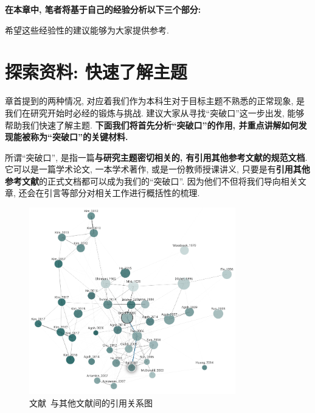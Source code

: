 \documentclass{booki}
\begin{document}
\textbf{在本章中, 笔者将基于自己的经验分析以下三个部分:}
{\begin{center}
    \noindent{}
\end{center}}
希望这些经验性的建议能够为大家提供参考.

\section{探索资料: 快速了解主题}
章首提到的两种情况, 对应着我们作为本科生对于目标主题不熟悉的正常现象, 是我们在研究开始时必经的锻炼与挑战. 建议大家从寻找``突破口''这一步出发, 能够帮助我们快速了解主题. {\textbf{下面我们将首先分析``突破口''的作用, 并重点讲解如何发现能被称为``突破口''的关键材料.}}

所谓``突破口'', 是指一篇\textbf{与研究主题密切相关的, 有引用其他参考文献的规范文档}. 它可以是一篇学术论文, 一本学术著作, 或是一份教师授课讲义, 只要是有\textbf{引用其他参考文献}的正式文档都可以成为我们的``突破口''. 因为他们不但将我们导向相关文章, 还会在引言等部分对相关工作进行概括性的梳理.

\begin{figure}[H]
    \centering
    \includegraphics[width=0.8\textwidth]{figure/graph.png}
    \caption{文献~\cite{GesselMiki2005}与其他文献间的引用关系图}
    \label{fig:mikiGrapg}
\end{figure}
\end{document}
